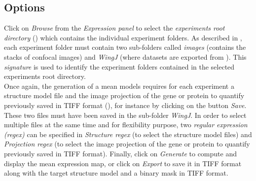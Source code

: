 \subsection{Options}
Click on \textit{Browse} from the \textit{Expression panel} to select the \textit{experiments root directory} () which contains the individual experiment folders. As described in , each experiment folder must contain two sub-folders called \textit{images} (contains the stacks of confocal images) and \textit{WingJ} (where datasets are exported from \wingj). This \textit{signature} is used to identify the experiment folders contained in the selected experiments root directory.\\

Once again, the generation of a mean models requires for each experiment a \wingj structure model file and the image projection of the gene or protein to quantify previously saved in TIFF format (), for instance by clicking on the button \emph{Save}. These two files must have been saved in the sub-folder \textit{WingJ}. In order to select multiple files at the same time and for flexibility purpose, two \textit{regular expression (regex)} can be specified in \textit{Structure regex} (to select the \wingj structure model files) and \textit{Projection regex} (to select the image projection of the gene or protein to quantify previously saved in TIFF format). Finally, click on \textit{Generate} to compute and display the mean expression map, or click on \textit{Export} to save it in TIFF format along with the target structure model and a binary mask in TIFF format.



